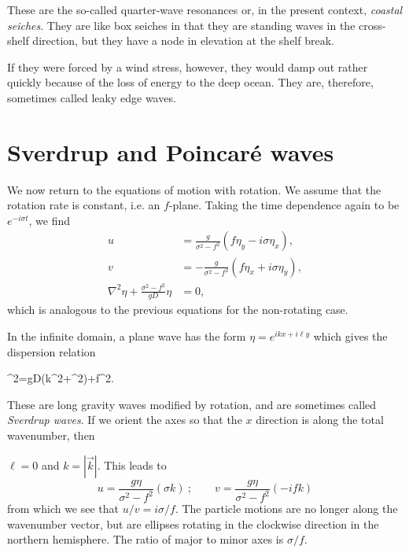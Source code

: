 \sourcepagebreak

These are the so-called quarter-wave resonances or, in the present context,
\emph{coastal seiches}. They are like box seiches in that they are standing waves in
the cross-shelf direction, but they have a node in elevation at the shelf break.


\wavefiguremark

If they were forced by a wind stress, however, they would damp out rather quickly
because of the loss of energy to the deep ocean. They are, therefore, sometimes called
leaky edge waves.

\section{Sverdrup and Poincaré waves}

We now return to the equations of motion with rotation. We assume that the rotation
rate is constant, i.e. an $f$-plane. Taking the time dependence again to be
$e^{-i\sigma t}$, we find
\begin{align*}
	u                                        & =\frac{g}{\sigma^2-f^2}(f\eta_y-i\sigma\eta_x),  \\
	v                                        & =-\frac{g}{\sigma^2-f^2}(f\eta_x+i\sigma\eta_y), \\
	\nabla^2\eta+\frac{\sigma^2-f^2}{gD}\eta & =0,
\end{align*}
which is analogous to the previous equations for the non-rotating case.

In the infinite domain, a plane wave has the form $\eta=e^{ikx+i\ell y}$ which gives
the dispersion relation
\begin{waveequation}
	\sigma^2=gD(k^2+\ell^2)+f^2.
\end{waveequation}
These are long gravity waves modified by rotation, and are sometimes called
\emph{Sverdrup waves}. If we orient the axes so that the $x$ direction is along the
total wavenumber, then

\sourcepagebreak

$\ell=0$ and $k=|\vec{k}|$. This leads to
\[
	u=\frac{g\eta}{\sigma^2-f^2}(\sigma k)
	\ ;\qquad
	v=\frac{g\eta}{\sigma^2-f^2}(-ifk)
\]
from which we see that $u/v=i\sigma/f$. The particle motions are no longer along the
wavenumber vector, but are ellipses rotating in the clockwise direction in the northern
hemisphere. The ratio of major to minor axes is $\sigma/f$.

